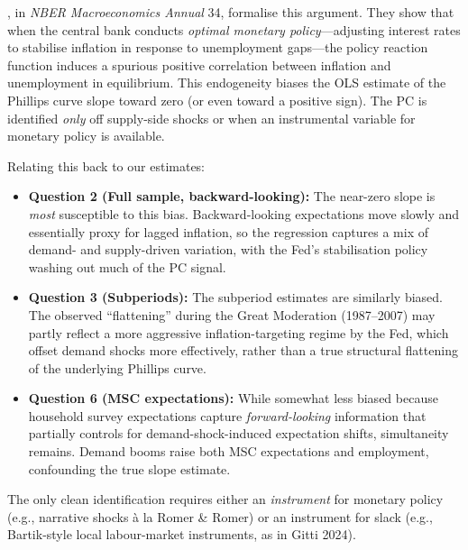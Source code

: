 \documentclass[dvipsnames,11pt]{article}
\begin{document}
\begin{enumerate}[resume]
\begin{solution}
                    \textcite{mcleay2020optimal}, in \emph{NBER Macroeconomics Annual} 34, formalise this argument. They show that when the central bank conducts \emph{optimal monetary policy}---adjusting interest rates to stabilise inflation in response to unemployment gaps---the policy reaction function induces a spurious positive correlation between inflation and unemployment in equilibrium. This endogeneity biases the OLS estimate of the Phillips curve slope toward zero (or even toward a positive sign). The PC is identified \emph{only} off supply-side shocks or when an instrumental variable for monetary policy is available.
                    
                    Relating this back to our estimates:
                    
                    \begin{itemize}
                        \item \textbf{Question 2 (Full sample, backward-looking):} The near-zero slope is \emph{most} susceptible to this bias. Backward-looking expectations move slowly and essentially proxy for lagged inflation, so the regression captures a mix of demand- and supply-driven variation, with the Fed's stabilisation policy washing out much of the PC signal.
                        
                        \item \textbf{Question 3 (Subperiods):} The subperiod estimates are similarly biased. The observed ``flattening'' during the Great Moderation (1987--2007) may partly reflect a more aggressive inflation-targeting regime by the Fed, which offset demand shocks more effectively, rather than a true structural flattening of the underlying Phillips curve.
                        
                        \item \textbf{Question 6 (MSC expectations):} While somewhat less biased because household survey expectations capture \emph{forward-looking} information that partially controls for demand-shock-induced expectation shifts, simultaneity remains. Demand booms raise both MSC expectations and employment, confounding the true slope estimate.
                    \end{itemize}

                    The only clean identification requires either an \emph{instrument} for monetary policy (e.g., narrative shocks \`a la Romer \& Romer) or an instrument for slack (e.g., Bartik-style local labour-market instruments, as in Gitti 2024).
                    
                \end{solution}
                
        \end{enumerate}
\end{document}
